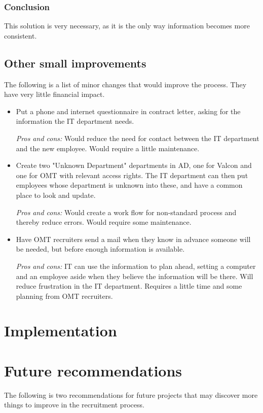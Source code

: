 \subsubsection{Conclusion} 
This solution is very necessary, as it is the only way information becomes more consistent.

\subsection{Other small improvements}
The following is a list of minor changes that would improve the process.
They have very little financial impact.
\begin{itemize}
\item Put a phone and internet questionnaire in contract letter, asking for the information the IT department needs.

\emph{Pros and cons:} Would reduce the need for contact between the IT department and the new employee.
Would require a little maintenance.

\item Create two "Unknown Department" departments in AD, one for Valcon and one for OMT with relevant access rights. The IT department can then put employees whose department is unknown into these, and have a common place to look and update.

\emph{Pros and cons:} Would create a work flow for non-standard process and thereby reduce errors. Would require some maintenance.

\item Have OMT recruiters send a mail when they know in advance someone will be needed, but before enough information is available.

\emph{Pros and cons:} IT can use the information to plan ahead, setting a computer and an employee aside when they believe the information will be there. Will reduce frustration in the IT department. Requires a little time and some planning from OMT recruiters.
\end{itemize}

\section{Implementation}

\section{Future recommendations}
The following is two recommendations for future projects that may discover more things to improve in the recruitment process.


